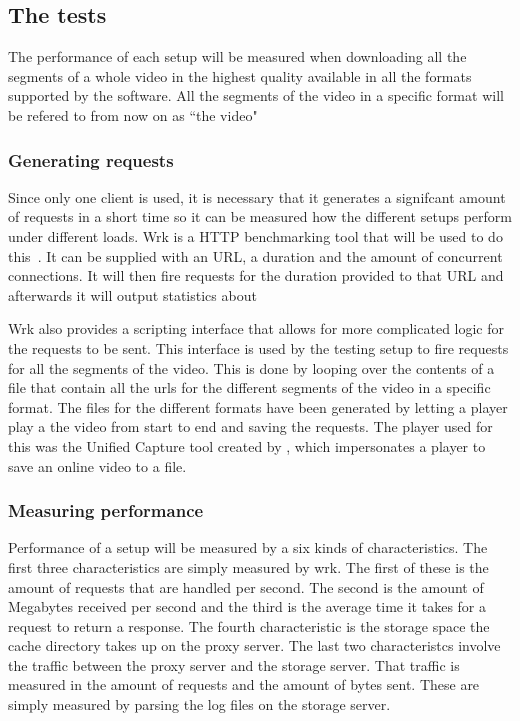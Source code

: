 \documentclass[twoside,openright]{uva-bachelor-thesis}
\begin{document}
\subsection{The tests}
The performance of each setup will be measured when downloading all the
segments of a whole video in the highest quality available in all the formats
supported by the \usp software. All the segments of the video in a specific
format will be refered to from now on as ``the video"

\subsubsection{Generating requests}
Since only one client is used, it is necessary that it generates a signifcant
amount of requests in a short time so it can be measured how the different
setups perform under different loads. Wrk is a HTTP benchmarking tool that will
be used to do this~\autocite{wrk}. It can be supplied with an URL, a duration
and the amount of concurrent connections. It will then fire requests for the
duration provided to that URL and afterwards it will output statistics about

Wrk also provides a scripting interface that allows for more complicated logic
for the requests to be sent. This interface is used by the testing setup to fire
requests for all the segments of the video. This is done by looping over the
contents of a file that contain all the urls for the different segments of the
video in a specific format. The files for the different formats have been
generated by letting a player play a the video from start to end and saving the
requests. The player used for this was the Unified Capture tool created by \usp,
which impersonates a player to save an online video to a file.

\subsubsection{Measuring performance}
Performance of a setup will be measured by a six kinds of characteristics. The
first three characteristics are simply measured by wrk. The first of these is
the amount of requests that are handled per second. The second is the amount of
Megabytes received per second and the third is the average time it takes for a
request to return a response. The fourth characteristic is the storage space the
cache directory takes up on the proxy server. The last two characteristcs
involve the traffic between the proxy server and the storage server. That
traffic is measured in the amount of requests and the amount of bytes sent.
These are simply measured by parsing the log files on the storage server.
\end{document}
